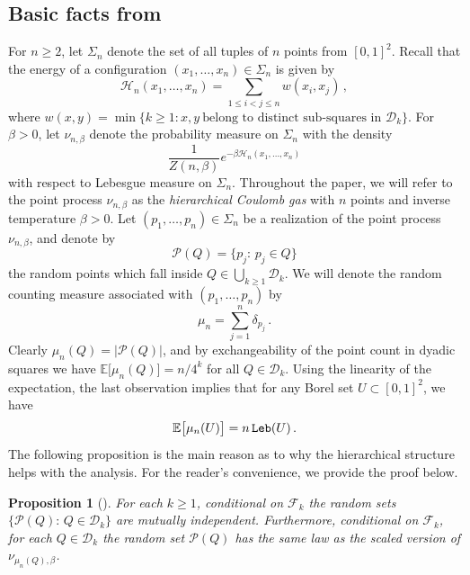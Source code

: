 \documentclass[11pt]{amsart}
\newtheorem{proposition}[theorem]{Proposition}
\theoremstyle{definition}
\theoremstyle{remark}
\numberwithin{equation}{section}
\newcommand{\bE}{\mathbb E}
\begin{document}
	\subsection{Basic facts from\texorpdfstring{~\cite{chatterjee}}{Cha19}}
	For $n\ge 2$, let $\Sigma_n$ denote the set of all tuples of $n$ points from $[0,1]^2$. Recall that the energy of a configuration $(x_1,\ldots,x_n)\in\Sigma_n$ is given by
	\begin{equation}
		\label{eq:def_of_hamiltonian}
		\mathcal{H}_n(x_1,\ldots,x_n) = \sum_{1\le i <j\le n} w(x_i,x_j) \, ,
	\end{equation}
	where $w(x,y) = \min \{ k \ge 1 : x,y \ \text{belong to distinct sub-squares in } \mathcal{D}_k\}$. For $\beta>0$, let $\nu_{n,\beta}$ denote the probability measure on $\Sigma_n$ with the density
	\[
	\frac{1}{Z(n,\beta)} e^{-\beta \mathcal{H}_n(x_1,\ldots,x_n)}
	\] 
	with respect to Lebesgue measure on $\Sigma_n$. Throughout the paper, we will refer to the point process $\nu_{n,\beta}$ as the \emph{hierarchical Coulomb gas} with $n$ points and inverse temperature $\beta>0$. Let $(p_1,\ldots,p_n)\in \Sigma_n$ be a realization of the point process $\nu_{n,\beta}$, and denote by
	\[
	\mathcal{P}(Q) = \{p_j : \, p_j \in Q\}
	\]
	the random points which fall inside $Q\in \bigcup_{k\ge 1}\mathcal{D}_k$. We will denote the random counting measure associated with $(p_1,\ldots,p_n)$ by
	\begin{equation}
		\label{eq:def_random_counting_measure_hcg}
		\mu_n = \sum_{j=1}^{n} \delta_{p_j} \, .
	\end{equation}
	Clearly $\mu_n(Q) = |\mathcal{P}(Q)|$, and by exchangeability of the point count in dyadic squares we have $\bE\big[\mu_n(Q)\big] = n/4^k$ for all $Q\in \mathcal{D}_k$. Using the linearity of the expectation, the last observation implies that for any Borel set $U\subset[0,1]^2$, we have
	\begin{equation*}
		\label{eq:formula_for_expectation}
		\bE\big[\mu_n(U)\big] = n \, {\tt Leb}(U) \, .
	\end{equation*} 
	The following proposition is the main reason as to why the hierarchical structure helps with the analysis. For the reader's convenience, we provide the proof below.
	\begin{proposition}
		[{\cite[Lemma~3.6]{chatterjee}}]	\label{prop:self_similarity_and_conditional_independence}
		For each $k\ge 1$, conditional on $\mathcal{F}_k$ the random sets $\{ \mathcal{P}(Q) : \, Q\in \mathcal{D}_k\}$ are mutually independent. Furthermore, conditional on $\mathcal{F}_k$, for each $Q\in \mathcal{D}_k$ the random set $\mathcal{P}(Q)$ has the same law as the scaled version of $\nu_{\mu_n(Q),\beta}$.
	\end{proposition}
\end{document}
